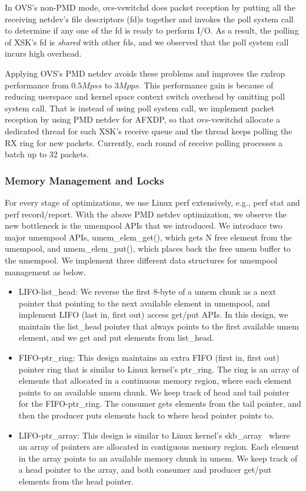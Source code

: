 \documentclass[10pt,numbers,reprint]{sigplanconf}
\begin{document}
In OVS's non-PMD mode, ovs-vswitchd does packet reception by putting all the
receiving netdev's file descriptors (fd)s together and invokes the poll system
call to determine if any one of the fd is ready to perform I/O.  As a result,
the polling of XSK's fd  is {\em shared} with other fds, and
we observed that the poll system call incurs high overhead.

Applying OVS's PMD netdev avoids these problems and improves the rxdrop performance
from $0.5Mpss$ to $3Mpps$. This performance gain is because of reducing userspace
and kernel space context switch overhead by omitting poll system call.
That is instead of using poll system call, we implement packet reception by using
PMD netdev for AFXDP, so that ovs-vswitchd allocate a dedicated thread for each
XSK's receive queue and the thread keeps polling the RX ring for new packets.
Currently, each round of receive polling processes a batch up to 32 packets.

\subsubsection{Memory Management and Locks}\label{memorym}
For every stage of optimizations, we use Linux perf extensively, e.g., perf stat
and perf record/report.  With the above PMD netdev optimization, we observe the
new bottleneck is the umempool APIs that we introduced.
We introduce two major umempool APIs, umem\_elem\_get(), which gets N free
element from the umempool, and umem\_elem\_put(), which places back the free
umem buffer to the umempool. We implement three different data structures for
umempool management as below.
\begin{itemize}
\item LIFO-list\_head: We reverse the first 8-byte of a umem chunk as a next
pointer that pointing to the next available element in umempool, and implement
LIFO (last in, first out) access get/put APIs. In this design, we maintain the
list\_head pointer that always points to the first available umem element,
and we get and put elements from list\_head.
\item FIFO-ptr\_ring: This design maintains an extra FIFO (first in, first out)
pointer ring that is similar to Linux kernel's ptr\_ring. The ring is an array
of elements that allocated in a continuous memory region, where each element
points to an available umem chunk. We keep track of head and tail pointer for
the FIFO-ptr\_ring. The consumer gets elements from the tail pointer,
and then the producer puts elements back to where head pointer points to.
\item LIFO-ptr\_array: This design is similar to Linux kernel's
skb\_array~\cite{skbarray} where an array of pointers are allocated
in contiguous memory region. Each element in the array points to an available
memory chunk in umem.  We keep track of a head pointer to the array,
and both consumer and producer get/put elements from the head pointer.
\end{itemize}
\end{document}
